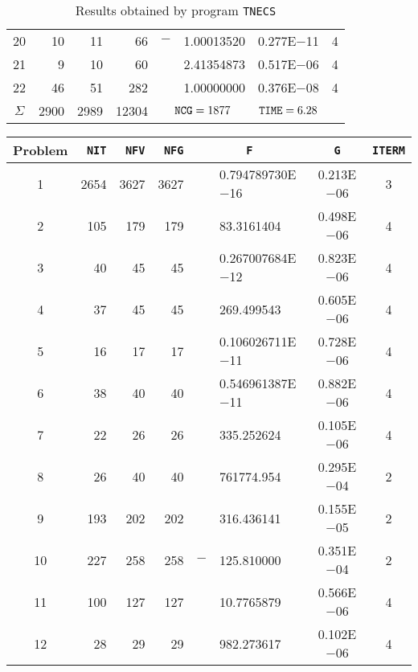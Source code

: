 \documentclass{esub2acm}
\begin{document}
\begin{table}
\begin{tabular}{c|rrrr@{}lcc}
20  &   10  &   11  &   66  &   $-$ &   1.00013520  &   0.277E$-$11 &   4   \\
21  &   9   &   10  &   60  &       &   2.41354873  &   0.517E$-$06 &   4   \\
22  &   46  &   51  &   282 &       &   1.00000000  &   0.376E$-$08 &   4   \\ \hline
$\Sigma$\rule[-2pt]{0pt}{12pt} & 2900 & 2989 & 12304 & \multicolumn{2}{c}{${\tt NCG} = 1877$} & ${\tt TIME} = 6.28$ & \\ \hline
\end{tabular}
\caption{Results obtained by program {\tt TNECS}} \label{tnecs}
\end{table}

\clearpage

\begin{table}
\footnotesize
\centering
\begin{tabular}{c|rrrr@{}lcc} \hline
Problem\rule[-2pt]{0pt}{12pt} & {\tt NIT} & {\tt NFV} & {\tt NFG} & \multicolumn{2}{c}{\tt F} & {\tt G} & {\tt ITERM} \\ \hline
1\rule[-2pt]{0pt}{12pt} &   2654    &   3627    &   3627    &       &   0.794789730E$-$16   &   0.213E$-$06 &   3   \\
2   &   105 &   179 &   179 &       &   83.3161404  &   0.498E$-$06 &   4   \\
3   &   40  &   45  &   45  &       &   0.267007684E$-$12   &   0.823E$-$06 &   4   \\
4   &   37  &   45  &   45  &       &   269.499543  &   0.605E$-$06 &   4   \\
5   &   16  &   17  &   17  &       &   0.106026711E$-$11   &   0.728E$-$06 &   4   \\
6   &   38  &   40  &   40  &       &   0.546961387E$-$11   &   0.882E$-$06 &   4   \\
7   &   22  &   26  &   26  &       &   335.252624  &   0.105E$-$06 &   4   \\
8   &   26  &   40  &   40  &       &   761774.954  &   0.295E$-$04 &   2   \\
9   &   193 &   202 &   202 &       &   316.436141  &   0.155E$-$05 &   2   \\
10  &   227 &   258 &   258 &   $-$ &   125.810000  &   0.351E$-$04 &   2   \\
11  &   100 &   127 &   127 &       &   10.7765879  &   0.566E$-$06 &   4   \\
12  &   28  &   29  &   29  &       &   982.273617  &   0.102E$-$06 &   4   \\

\end{tabular}
\end{table}
\end{document}

